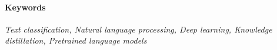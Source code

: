 \paragraph{Keywords}
\textit{Text classification, Natural language processing, Deep learning, Knowledge distillation, Pretrained language models}
